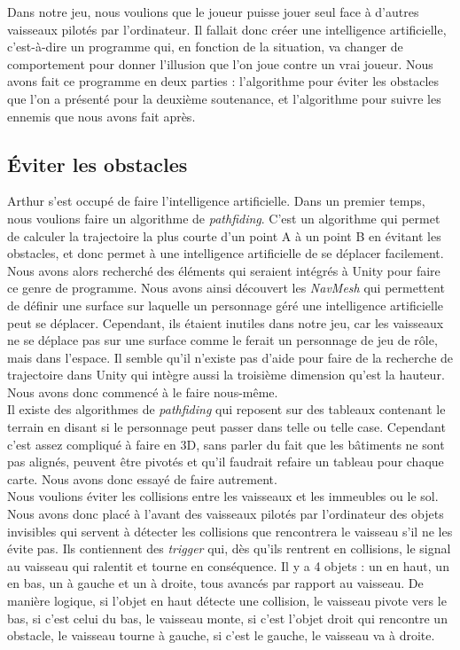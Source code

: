 \documentclass[12pt, titlepage]{article}
\begin{document}
\begin{spacing}{1.5}
Dans notre jeu, nous voulions que le joueur puisse jouer seul face à d'autres vaisseaux pilotés par l'ordinateur. Il fallait donc créer une intelligence artificielle, c'est-à-dire un programme qui, en fonction de la situation, va changer de comportement pour donner l'illusion que l'on joue contre un vrai joueur. Nous avons fait ce programme en deux parties : l'algorithme pour éviter les obstacles que l'on a présenté pour la deuxième soutenance, et l'algorithme pour suivre les ennemis que nous avons fait après.\\

\subsection{Éviter les obstacles}

Arthur s'est occupé de faire l'intelligence artificielle. Dans un premier temps, nous voulions faire un  algorithme de \textit{pathfiding}. C'est un algorithme qui permet de calculer la trajectoire la plus courte d'un point A à un point B en évitant les obstacles, et donc permet à une intelligence artificielle de se déplacer facilement.\\

Nous avons alors recherché des éléments qui seraient intégrés à Unity pour faire ce genre de programme. Nous avons ainsi découvert les \textit{NavMesh} qui permettent de définir une surface sur laquelle un personnage géré une intelligence artificielle peut se déplacer. Cependant, ils étaient inutiles dans notre jeu, car les vaisseaux ne se déplace pas sur une surface comme le ferait un personnage de jeu de rôle, mais dans l'espace. Il semble qu'il n'existe pas d'aide pour faire de la recherche de trajectoire dans Unity qui intègre aussi la troisième dimension qu'est la hauteur. Nous avons donc commencé à le faire nous-même.\\

Il existe des algorithmes de \textit{pathfiding} qui reposent sur des tableaux contenant le terrain en disant si le personnage peut passer dans telle ou telle case. Cependant c'est assez compliqué à faire en 3D, sans parler du fait que les bâtiments ne sont pas alignés, peuvent être pivotés et qu'il faudrait refaire un tableau pour chaque carte. Nous avons donc essayé de faire autrement.\\

Nous voulions éviter les collisions entre les vaisseaux et les immeubles ou le sol. Nous avons donc placé à l'avant des vaisseaux pilotés par l'ordinateur des objets invisibles qui servent à détecter les collisions que rencontrera le vaisseau s'il ne les évite pas. Ils contiennent des \textit{trigger} qui, dès qu'ils rentrent en collisions, le signal au vaisseau qui ralentit et tourne en conséquence. Il y a 4 objets : un en haut, un en bas, un à gauche et un à droite, tous avancés par rapport au vaisseau. De manière logique, si l'objet en haut détecte une collision, le vaisseau pivote vers le bas, si c'est celui du bas, le vaisseau monte, si c'est l'objet droit qui rencontre un obstacle, le vaisseau tourne à gauche, si c'est le gauche, le vaisseau va à droite.\\


\end{spacing}
\end{document}
